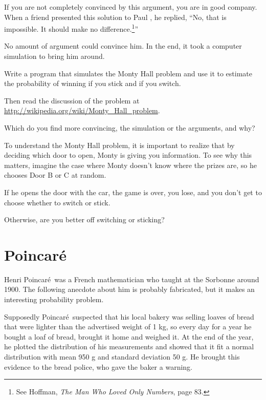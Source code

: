 \documentclass[12pt]{book}
\begin{document}
If you are not completely convinced by this argument, you are
in good company.  When a friend presented this solution to
Paul \Erdos, he replied, ``No, that is impossible.  It should
make no difference.\footnote{See Hoffman, {\em The Man Who Loved
Only Numbers}, page 83.}''

No amount of argument could convince him.  In the end, it took
a computer simulation to bring him around.

\begin{exercise}
Write a program that simulates the Monty Hall problem and use
it to estimate the probability of winning if you stick and if
you switch.

Then read the discussion of the problem at
\url{http://wikipedia.org/wiki/Monty_Hall_problem}.

Which do you find more convincing, the simulation or the arguments,
and why?

\end{exercise}


\begin{exercise}
To understand the Monty Hall problem, it is important to realize
that by deciding which door to open, Monty is giving you information.
To see why this matters, imagine the case where Monty doesn't
know where the prizes are, so he chooses Door B or C at random.

If he opens the door with the car, the game is over, you lose, and
you don't get to choose whether to switch or stick.

Otherwise, are you better off switching or sticking?

\end{exercise}



\newcommand{\Poincare}{Poincar\'{e}}

\section{\Poincare}

Henri \Poincare~was a French mathematician who taught at the Sorbonne
around 1900.  The following anecdote about him is probably fabricated,
but it makes an interesting probability problem.

Supposedly \Poincare~suspected that his local bakery was selling
loaves of bread that were lighter than the advertised weight of 1 kg,
so every day for a year he bought a loaf of bread, brought it home and
weighed it.  At the end of the year, he plotted the distribution of
his measurements and showed that it fit a normal distribution with
mean 950 g and standard deviation 50 g.  He brought this evidence to
the bread police, who gave the baker a warning.
\end{document}
